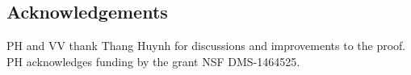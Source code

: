 \documentclass[12pt]{article}
\newcommand{\1}{\mathbf{1}}
\begin{document}
%
%
%
%



\subsection*{Acknowledgements}
PH and VV  thank Thang Huynh for discussions and improvements to the proof.  PH acknowledges funding by the grant NSF DMS-1464525. 


\end{document}
